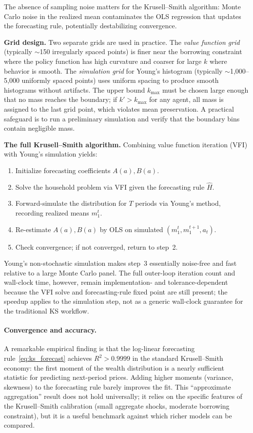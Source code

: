 \documentclass[11pt,a4paper]{report}
\begin{document}
\noindent
The absence of sampling noise matters for the Krusell--Smith algorithm: Monte Carlo noise in the realized mean contaminates the OLS regression that updates the forecasting rule, potentially destabilizing convergence.

\medskip\noindent\textbf{Grid design.}
Two separate grids are used in practice.  The \emph{value function grid} (typically $\sim$150 irregularly spaced points) is finer near the borrowing constraint where the policy function has high curvature and coarser for large $k$ where behavior is smooth.  The \emph{simulation grid} for Young's histogram (typically $\sim$1,000--5,000 uniformly spaced points) uses uniform spacing to produce smooth histograms without artifacts.  The upper bound $k_{\max}$ must be chosen large enough that no mass reaches the boundary; if $k' > k_{\max}$ for any agent, all mass is assigned to the last grid point, which violates mean preservation.  A practical safeguard is to run a preliminary simulation and verify that the boundary bins contain negligible mass.

\medskip\noindent\textbf{The full Krusell--Smith algorithm.}
Combining value function iteration (VFI) with Young's simulation yields:
\begin{enumerate}[itemsep=2pt]
\item Initialize forecasting coefficients $A(a), B(a)$.
\item Solve the household problem via VFI given the forecasting rule $\hat{H}$.
\item Forward-simulate the distribution for $T$ periods via Young's method, recording realized means $m_1^t$.
\item Re-estimate $A(a), B(a)$ by OLS on simulated $(m_1^t, m_1^{t+1}, a_t)$.
\item Check convergence; if not converged, return to step~2.
\end{enumerate}
Young's non-stochastic simulation makes step~3 essentially noise-free and fast relative to a large Monte Carlo panel.  The full outer-loop iteration count and wall-clock time, however, remain implementation- and tolerance-dependent because the VFI solve and forecasting-rule fixed point are still present; the speedup applies to the simulation step, not as a generic wall-clock guarantee for the traditional KS workflow.

\paragraph{Convergence and accuracy.}
A remarkable empirical finding is that the log-linear forecasting rule~\eqref{eq:ks_forecast} achieves $R^2 > 0.9999$ in the standard Krusell--Smith economy: the first moment of the wealth distribution is a nearly sufficient statistic for predicting next-period prices.  Adding higher moments (variance, skewness) to the forecasting rule barely improves the fit.  This ``approximate aggregation'' result does not hold universally; it relies on the specific features of the Krusell--Smith calibration (small aggregate shocks, moderate borrowing constraint), but it is a useful benchmark against which richer models can be compared.
\end{document}
